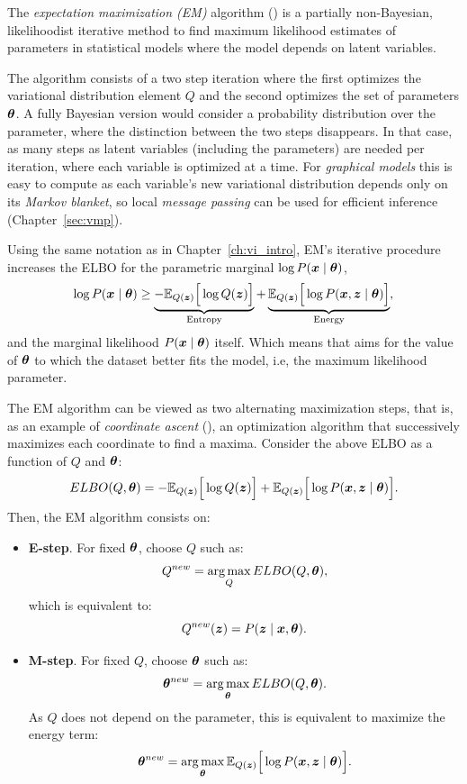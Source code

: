 
The \emph{expectation maximization (EM)} algorithm (\cite{dempster1977maximum,mclachlan2007algorithm, bishop2006pattern}) is a partially non-Bayesian, likelihoodist iterative method to find maximum likelihood estimates of parameters in statistical models where the model depends on latent variables.

The algorithm consists of a two step iteration where the first optimizes the variational distribution element \(Q\)  and the second optimizes the set of parameters \(\bm{\theta}\). A fully Bayesian version would consider a probability distribution over the parameter, where the distinction between the two steps disappears. In that case, as many steps as latent variables (including the parameters) are needed per iteration, where each variable is optimized at a time. For \emph{graphical models} this is easy to compute as each variable's new variational distribution depends only on its \emph{Markov blanket}, so local \emph{message passing} can be used for efficient inference (Chapter~\ref{sec:vmp}).

Using the same notation as in Chapter~\ref{ch:vi_intro}, EM's iterative procedure increases the ELBO for the parametric marginal \(\log P(\bm{x} \mid \bm{\theta})\),
\[
  \log{P(\bm{x}\mid \bm{\theta})} \geq \underbrace{-\mathbb{E}_{Q(\bm{z})}\Big[\log{Q(\bm{z})}\Big]}_{\text{Entropy}} + \underbrace{\mathbb{E}_{Q(\bm{z})}\Big[\log{P(\bm{x}, \bm{z}\mid \bm{\theta})}\Big]}_{\text{Energy}},
\]
and the marginal likelihood \(P(\bm{x} \mid \bm{\theta})\) itself. Which means that aims for the value of \(\bm{\theta}\) to which the dataset better fits the model, i.e, the maximum likelihood parameter.


The EM algorithm can be viewed as two alternating maximization steps, that is, as an example of \emph{coordinate ascent} (\cite{neal1998view}), an optimization algorithm that successively maximizes each coordinate to find a maxima. Consider the above ELBO as a function of \(Q\) and \(\bm{\theta}\):
\[
  ELBO(Q, \bm{\theta}) = -\mathbb{E}_{Q(\bm{z})}\Big[\log{Q(\bm{z})}\Big] + \mathbb{E}_{Q(\bm{z})}\Big[\log{P(\bm{x}, \bm{z}\mid \bm{\theta})}\Big].
\]
Then, the EM algorithm consists on:
\begin{itemize}
  \item \textbf{E-step}. For fixed \(\bm{\theta}\), choose \(Q\) such as:
    \[
    Q^{new} = \operatorname*{arg\,max}_{Q}ELBO(Q, \bm{\theta}),
    \]
    which is equivalent to:
    \[
    Q^{new}(\bm{z}) = P(\bm{z} \mid \bm{x} , \bm{\theta}).
    \]
  \item \textbf{M-step}. For fixed \(Q\), choose \(\bm{\theta}\) such as:
    \[
    \bm{\theta}^{new} = \operatorname*{arg\,max}_{\bm{\theta}}ELBO(Q, \bm{\theta}).
    \]
    As \(Q\) does not depend on the parameter, this is equivalent to maximize the energy term:
    \[
    \bm{\theta}^{new} = \operatorname*{arg\,max}_{\bm{\theta}} \mathbb{E}_{Q(\bm{z})}\Big[\log{P(\bm{x}, \bm{z}\mid \bm{\theta})}\Big].
    \]
\end{itemize}

